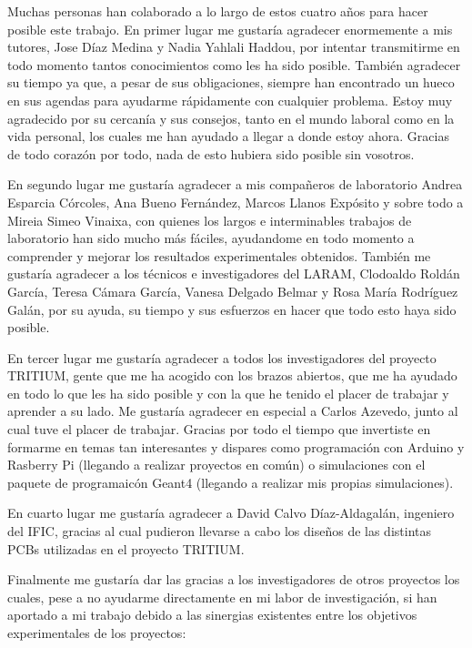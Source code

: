Muchas personas han colaborado a lo largo de estos cuatro años para hacer posible este trabajo. En primer lugar me gustaría agradecer enormemente a mis tutores, Jose Díaz Medina y Nadia Yahlali Haddou, por intentar transmitirme en todo momento tantos conocimientos como les ha sido posible. También agradecer su tiempo ya que, a pesar de sus obligaciones, siempre han encontrado un hueco en sus agendas para ayudarme rápidamente con cualquier problema. Estoy muy agradecido por su cercanía y sus consejos, tanto en el mundo laboral como en la vida personal, los cuales me han ayudado a llegar a donde estoy ahora. Gracias de todo corazón por todo, nada de esto hubiera sido posible sin vosotros.

En segundo lugar me gustaría agradecer a mis compañeros de laboratorio Andrea Esparcia Córcoles, Ana Bueno Fernández, Marcos Llanos Expósito y sobre todo a Mireia Simeo Vinaixa, con quienes los largos e interminables trabajos de laboratorio han sido mucho más fáciles, ayudandome en todo momento a comprender y mejorar los resultados experimentales obtenidos.  También me gustaría agradecer a los técnicos e investigadores del LARAM, Clodoaldo Roldán García, Teresa Cámara García, Vanesa Delgado Belmar y Rosa María Rodríguez Galán, por su ayuda, su tiempo y sus esfuerzos en hacer que todo esto haya sido posible.

En tercer lugar me gustaría agradecer a todos los investigadores del proyecto TRITIUM, gente que me ha acogido con los brazos abiertos, que me ha ayudado en todo lo que les ha sido posible y con la que he tenido el placer de trabajar y aprender a su lado. Me gustaría agradecer en especial a Carlos Azevedo, junto al cual tuve el placer de trabajar. Gracias por todo el tiempo que invertiste en formarme en temas tan interesantes y dispares como programación con Arduino y Rasberry Pi (llegando a realizar proyectos en común) o simulaciones con el paquete de programaicón Geant4 (llegando a realizar mis propias simulaciones).

En cuarto lugar me gustaría agradecer a David Calvo Díaz-Aldagalán, ingeniero del IFIC, gracias al cual pudieron llevarse a cabo los diseños de las distintas PCBs utilizadas en el proyecto TRITIUM.

Finalmente me gustaría dar las gracias a los investigadores de otros proyectos los cuales, pese a no ayudarme directamente en mi labor de investigación, si han aportado a mi trabajo debido a las sinergias existentes entre los objetivos experimentales de los proyectos:

